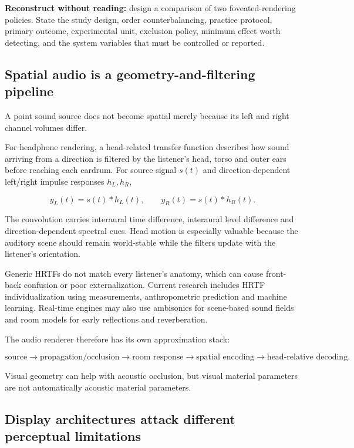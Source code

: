 \textbf{Reconstruct without reading:} design a comparison of two foveated-rendering policies. State the study design, order counterbalancing, practice protocol, primary outcome, experimental unit, exclusion policy, minimum effect worth detecting, and the system variables that must be controlled or reported.

\subsection{Spatial audio is a geometry-and-filtering pipeline}\label{spatial-audio-is-a-geometry-and-filtering-pipeline}

A point sound source does not become spatial merely because its left and right channel volumes differ.

For headphone rendering, a head-related transfer function describes how sound arriving from a direction is filtered by the listener's head, torso and outer ears before reaching each eardrum. For source signal \(s(t)\) and direction-dependent left/right impulse responses \(h_L,h_R\),

\[
y_L(t)=s(t)*h_L(t),\qquad
y_R(t)=s(t)*h_R(t).
\]

The convolution carries interaural time difference, interaural level difference and direction-dependent spectral cues. Head motion is especially valuable because the auditory scene should remain world-stable while the filters update with the listener's orientation.

Generic HRTFs do not match every listener's anatomy, which can cause front-back confusion or poor externalization. Current research includes HRTF individualization using measurements, anthropometric prediction and machine learning. Real-time engines may also use ambisonics for scene-based sound fields and room models for early reflections and reverberation.

The audio renderer therefore has its own approximation stack:

\[
\text{source} \rightarrow
\text{propagation/occlusion} \rightarrow
\text{room response} \rightarrow
\text{spatial encoding} \rightarrow
\text{head-relative decoding}.
\]

Visual geometry can help with acoustic occlusion, but visual material parameters are not automatically acoustic material parameters.

\subsection{Display architectures attack different perceptual limitations}\label{display-architectures-attack-different-perceptual-limitations}


